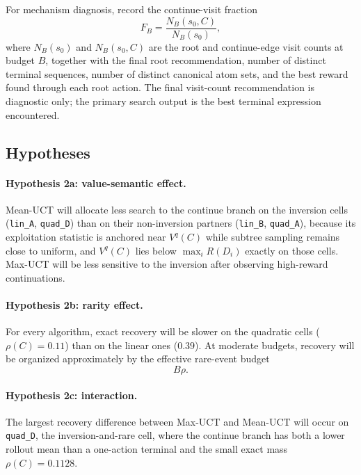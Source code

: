 \documentclass[11pt, a4paper]{article}
\theoremstyle{definition}
\begin{document}
For mechanism diagnosis, record the continue-visit fraction
\begin{equation}
    F_B
    =
    \frac{N_B(s_0,C)}{N_B(s_0)},
    \label{eq:continue-fraction}
\end{equation}
where \(N_B(s_0)\) and \(N_B(s_0,C)\) are the root and continue-edge visit
counts at budget \(B\), together with the final root recommendation, number
of distinct terminal
sequences, number of distinct canonical atom sets, and the best reward found
through each root action.  The final visit-count recommendation is diagnostic
only; the primary search output is the best terminal expression encountered.

\subsection{Hypotheses}

\paragraph{Hypothesis 2a: value-semantic effect.}
Mean-UCT will allocate less search to the continue branch on the inversion
cells (\texttt{lin\_A}, \texttt{quad\_D}) than on their non-inversion partners
(\texttt{lin\_B}, \texttt{quad\_A}), because its exploitation statistic is
anchored near \(V^q(C)\) while subtree sampling remains close to uniform, and
\(V^q(C)\) lies below \(\max_iR(D_i)\) exactly on those cells.  Max-UCT will be
less sensitive to the inversion after observing high-reward continuations.

\paragraph{Hypothesis 2b: rarity effect.}
For every algorithm, exact recovery will be slower on the quadratic cells
(\(\rho(C)=0.11\)) than on the linear ones (\(0.39\)).  At moderate budgets,
recovery will be organized approximately by the effective rare-event budget
\begin{equation}
    B\rho.
    \label{eq:effective-rare-budget}
\end{equation}

\paragraph{Hypothesis 2c: interaction.}
The largest recovery difference between Max-UCT and Mean-UCT will occur on
\texttt{quad\_D}, the inversion-and-rare cell, where the continue branch has
both a lower rollout mean than a one-action terminal and the small exact mass
\(\rho(C)=0.1128\).
\end{document}
